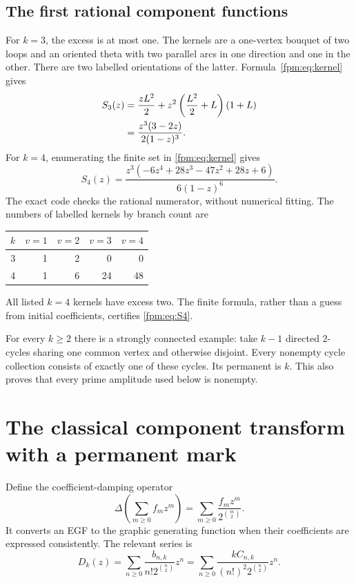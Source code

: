 \documentclass[11pt]{article}
\theoremstyle{definition}\newtheorem{definition}[theorem]{Definition}
\theoremstyle{remark}\newtheorem{remark}[theorem]{Remark}
\begin{document}
\subsection{The first rational component functions}
For $k=3$, the excess is at most one. The kernels are a one-vertex bouquet of two loops and an oriented theta with two parallel arcs in one direction and one in the other. There are two labelled orientations of the latter. Formula~\eqref{fpm:eq:kernel} gives
\begin{align}
 S_3(z)&=\frac{zL^2}{2}
 +z^2\left(\frac{L^2}{2}+L\right)(1+L)\notag\\
 &=\frac{z^3(3-2z)}{2(1-z)^3}.\label{fpm:eq:S3}
\end{align}
For $k=4$, enumerating the finite set in \eqref{fpm:eq:kernel} gives
\begin{equation}\label{fpm:eq:S4}
 S_4(z)=\frac{z^3(-6z^4+28z^3-47z^2+28z+6)}{6(1-z)^6}.
\end{equation}
The exact code checks the rational numerator, without numerical fitting. The numbers of labelled kernels by branch count are
\begin{center}
\begin{tabular}{c r r r r}
\toprule
$k$ & $v=1$ & $v=2$ & $v=3$ & $v=4$\\
\midrule
3&1&2&0&0\\
4&1&6&24&48\\
\bottomrule
\end{tabular}
\end{center}
All listed $k=4$ kernels have excess two. The finite formula, rather than a guess from initial coefficients, certifies \eqref{fpm:eq:S4}.

For every $k\ge2$ there is a strongly connected example: take $k-1$ directed 2-cycles sharing one common vertex and otherwise disjoint. Every nonempty cycle collection consists of exactly one of these cycles. Its permanent is $k$. This also proves that every prime amplitude used below is nonempty.

\section[The classical component transform]{The classical component transform with a permanent mark}\label{fpm:sec:transform}
Define the coefficient-damping operator
\begin{equation}\label{fpm:eq:delta}
 \Delta\!\left(\sum_{m\ge0}f_mz^m\right)
 =\sum_{m\ge0}\frac{f_mz^m}{2^{\binom m2}}.
\end{equation}
It converts an EGF to the graphic generating function when their coefficients are expressed consistently. The relevant series is
\begin{equation}\label{fpm:eq:Dk}
 D_k(z)=\sum_{n\ge0}\frac{b_{n,k}}{n!2^{\binom n2}}z^n
 =\sum_{n\ge0}\frac{kC_{n,k}}{(n!)^2 2^{\binom n2}}z^n.
\end{equation}
\end{document}
